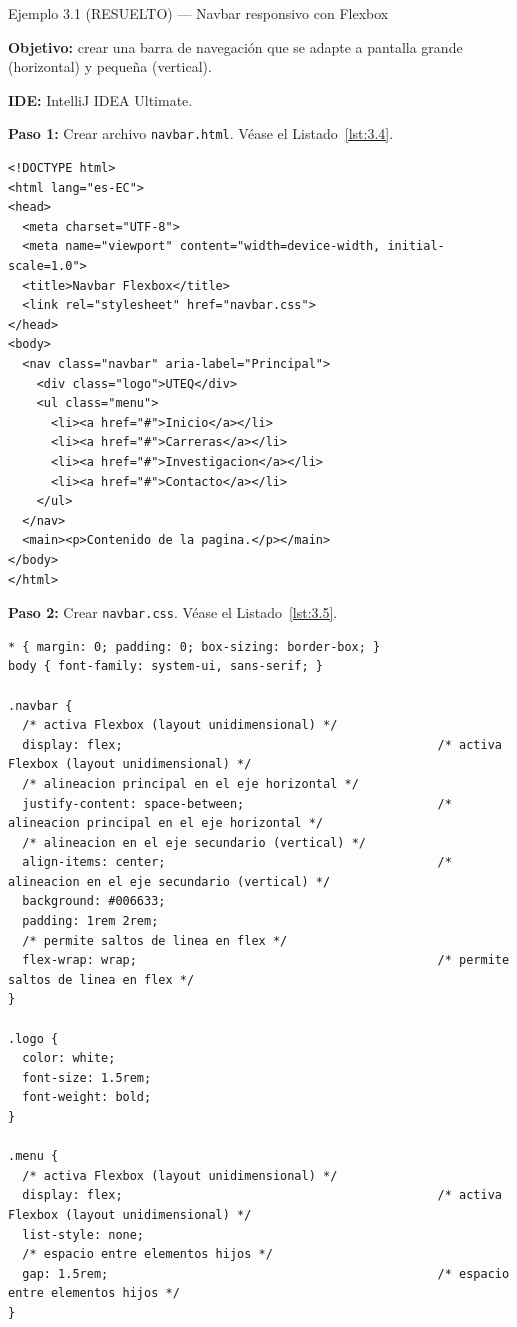 \begin{cajaejemplo}{Ejemplo 3.1 (RESUELTO) --- Navbar responsivo con Flexbox}

\textbf{Objetivo:} crear una barra de navegación que se adapte a
pantalla grande (horizontal) y pequeña (vertical).

\textbf{IDE:} IntelliJ IDEA Ultimate.

\textbf{Paso 1:} Crear archivo \texttt{navbar.html}. V\'ease el Listado~\ref{lst:3.4}.

\begin{lstlisting}[style=html,caption={navbar.html},label=lst:3.4]
<!DOCTYPE html>
<html lang="es-EC">
<head>
  <meta charset="UTF-8">
  <meta name="viewport" content="width=device-width, initial-scale=1.0">
  <title>Navbar Flexbox</title>
  <link rel="stylesheet" href="navbar.css">
</head>
<body>
  <nav class="navbar" aria-label="Principal">
    <div class="logo">UTEQ</div>
    <ul class="menu">
      <li><a href="#">Inicio</a></li>
      <li><a href="#">Carreras</a></li>
      <li><a href="#">Investigacion</a></li>
      <li><a href="#">Contacto</a></li>
    </ul>
  </nav>
  <main><p>Contenido de la pagina.</p></main>
</body>
</html>
\end{lstlisting}

\textbf{Paso 2:} Crear \texttt{navbar.css}. V\'ease el Listado~\ref{lst:3.5}.

\begin{lstlisting}[style=css,caption={navbar.css},label=lst:3.5]
* { margin: 0; padding: 0; box-sizing: border-box; }
body { font-family: system-ui, sans-serif; }

.navbar {
  /* activa Flexbox (layout unidimensional) */
  display: flex;                                            /* activa Flexbox (layout unidimensional) */
  /* alineacion principal en el eje horizontal */
  justify-content: space-between;                           /* alineacion principal en el eje horizontal */
  /* alineacion en el eje secundario (vertical) */
  align-items: center;                                      /* alineacion en el eje secundario (vertical) */
  background: #006633;
  padding: 1rem 2rem;
  /* permite saltos de linea en flex */
  flex-wrap: wrap;                                          /* permite saltos de linea en flex */
}

.logo {
  color: white;
  font-size: 1.5rem;
  font-weight: bold;
}

.menu {
  /* activa Flexbox (layout unidimensional) */
  display: flex;                                            /* activa Flexbox (layout unidimensional) */
  list-style: none;
  /* espacio entre elementos hijos */
  gap: 1.5rem;                                              /* espacio entre elementos hijos */
}


\end{lstlisting}
\end{cajaejemplo}
